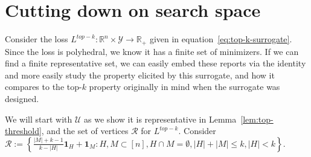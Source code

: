 \documentclass[12pt]{article}
\newcommand{\reals}{\mathbb{R}}
\newcommand{\R}{\mathcal{R}}
\newcommand{\U}{\mathcal{U}}
\newcommand{\Y}{\mathcal{Y}}
\begin{document}
\section{Cutting down on search space}
Consider the loss $L^{top-k} : \reals^n \times \Y \to \reals_+$ given in equation~\eqref{eq:top-k-surrogate}.
Since the loss is polyhedral, we know it has a finite set of minimizers.
If we can find a finite representative set, we can easily embed these reports via the identity and more easily study the property elicited by this surrogate, and how it compares to the top-$k$ property originally in mind when the surrogate was designed.

We will start with $\U$ as we show it is representative in Lemma~\ref{lem:top-threshold}, and the set of vertices $\R$ for $L^{top-k}$.
Consider $\R := \left\{ \frac{|M| + k -1}{k - |H|} \mathbf{1}_H + \mathbf{1}_M : H, M \subset [n], H\cap M = \emptyset, |H| + |M| \leq k, |H| < k \right\}$.
\end{document}
